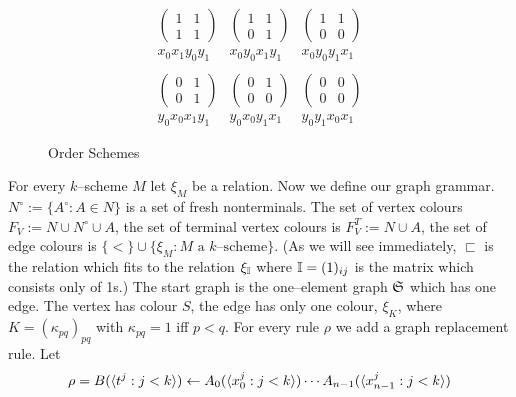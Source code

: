\begin{figure}
$$\begin{array}{ccc}
\left(\begin{array}{ll}
1 & 1 \\
1 & 1
\end{array}\right) &
\left(\begin{array}{ll}
1 & 1 \\
0 & 1
\end{array}\right) &
\left(\begin{array}{ll}
1 & 1 \\
0 & 0
\end{array}\right) \\
x_0x_1y_0y_1 &
x_0y_0x_1y_1 &
x_0y_0y_1x_1 \\
\\
\left(\begin{array}{ll}
0 & 1 \\
0 & 1
\end{array}\right) &
\left(\begin{array}{ll}
0 & 1 \\
0 & 0
\end{array}\right) &
\left(\begin{array}{ll}
0 & 0 \\
0 & 0
\end{array}\right) \\
y_0x_0x_1y_1 &
y_0x_0y_1x_1 &
y_0y_1x_0x_1
\end{array}$$
\caption{Order Schemes}
\label{fig:order}
\end{figure}
For every $k$--scheme $M$ let $\xi_M$ be a relation.
Now we define our graph grammar. $N^{\circ} := \{A^{\circ} 
: A \in N\}$ is a set of fresh nonterminals. The set of vertex 
colours $F_V := N \cup N^{\circ} \cup A$, the set of terminal vertex
colours is $F_V^T := N  \cup A$, the set of edge
colours is $\{<\} \cup \{\xi_M : M \mbox{ a $k$--scheme}\}$.
(As we will see immediately, $\sqsubset$ is the relation which
fits to the relation $\xi_{\mathbb{I}}$ where $\mathbb{I} = (1)_{ij}$ is
the matrix which consists only of 1s.) The start graph is the
one--element graph $\mathfrak{S}$ which has one edge. The vertex has 
colour $S$, the edge has only one colour, $\xi_{K}$, where 
$K = (\kappa_{pq})_{pq}$ with $\kappa_{pq} = 1$ iff $p < q$. 
For every rule $\rho$ we add a graph replacement rule. Let
\begin{equation}
\rho = B(\langle t^j : j < k\rangle) \leftarrow A_0(\langle x_0^j : j < k\rangle) 
\dotsb A_{n-1}(\langle x_{n-1}^j : j < k \rangle)
\end{equation}
